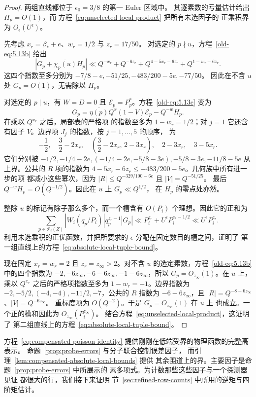 \documentclass[11pt,a4paper]{article}
\numberwithin{equation}{section}
\numberwithin{figure}{section}
\theoremstyle{definition}
\theoremstyle{remark}
\begin{document}
\begin{proof}
两组直线都位于 $\epsilon_0=3/8$ 的第一 Euler 区域中。
其逐素数的亏量估计给出 $H_p=O(1)$，而
方程~\eqref{eq:unselected-local-product} 把所有未选因子的
正乘积界为 $O_\epsilon(U^\epsilon)$。

先考虑 $x_r=\beta_*+e$、$w_r=1/2$ 与 $z_r=17/50$。
对选定的 $p\nmid u$，方程~\eqref{old-eq:5.13b} 给出
\[
 |G_p+\overline{\chi_p(u)}H_p|
 \ll Q^{-x_r}+Q^{-6z_r}
       +Q^{4-5x_r-6z_r}+Q^{1-w_r-6z_r}.
\]
这四个指数至多分别为
$-7/8-e,-51/25,-483/200-5e,-77/50$。
因此在不含 $u$ 处 $G_p=O(1)$，无需除以 $H_p$。

对选定的 $p\mid u$，有 $W=D=0$ 且
$\mathcal E_p=P_p^*$。方程~\eqref{old-eq:5.13c} 变为
\[
 G_p=\overline{\eta(p)}Q^x(1-V)\mathcal E_p-Q^{-w}H_p.
\]
在乘以 $Q^{x_r}$ 之后，局部表的严格项
的指数至多为 $1-w_r=1/2$；对 $j=1$ 它还含有因子
$V$。边界项 $J_j$ 的指数，按 $j=1,\ldots,5$ 的顺序，
为
\[
 -\frac12,\quad \frac32-2x_r,\quad
 \left(\frac32-2x_r,\,2-3x_r\right),\quad
 2-3x_r,\quad 3-5x_r.
\]
它们分别被
$-1/2,-1/4-2e,(-1/4-2e,-5/8-3e),-5/8-3e,-11/8-5e$
从上界。公共的 $R$ 项的指数为
$4-5x_r-6z_r\le-483/200-5e$。几何族中所有进一步的项
都减小这些幂次，因为
$|R|\le Q^{-329/100-6e}$ 且 $|V|=Q^{-51/25}$。
最后 $Q^{-w}H_p=O(Q^{-1/2})$。因此在 $u$ 上 $G_p\ll Q^{1/2}$，
在 $H_p$ 的零点处亦然。

整除 $u$ 的标记有除子那么多个，而一个槽含有 $O(P_i)$
个理想。因此它的正和为
\begin{equation}\label{eq:small-line-positive-slot}
 \sum_{p\in\mathcal P_i(Z)}
       |W_i(q_p/P_i)|q_p^{z_r-1}|G_p|
 \ll P_i^{z_r}+U^\epsilon P_i^{z_r-1/2}
 \ll U^\epsilon P_i^{z_r}.
\end{equation}
利用未选乘积的正优函数，并把所要求的 $\epsilon$
分配在固定数目的槽之间，证明了
第一组直线上的方程~\eqref{eq:absolute-local-tuple-bound}。

现在固定 $x_r=w_r=2$ 且 $z_r=z_\infty>2$。对不含
$u$ 的选定素数，方程~\eqref{old-eq:5.13b} 中的四个指数为
$-2,-6z_\infty,-6-6z_\infty,-1-6z_\infty$，所以
$G_p=O_{z_\infty}(1)$。在 $u$ 上，乘以
$Q^{x_r}$ 之后的严格项指数至多为 $1-w_r=-1$。边界指数为
$-2,-5/2,(-4,-4),-11/2,-7$，公共的 $R$ 指数为
$-6-6z_\infty$，且 $|R|=Q^{-8-6z_\infty}$、$|V|=Q^{-6z_\infty}$。
重标度项为 $O(Q^{-2})$。于是 $G_p=O_{z_\infty}(1)$ 在 $u$ 上
也成立。一个正的槽和因此为 $O_{z_\infty}(P_i^{z_\infty})$。
结合方程~\eqref{eq:unselected-local-product}，这证明了
第二组直线上的方程~\eqref{eq:absolute-local-tuple-bound}。
\end{proof}


方程~\eqref{eq:compensated-poisson-identity} 提供刚刚在低端受界的物理函数的完整高
表示。
命题~\ref{prop:probe-errors} 与分子联合控制误差因子，
而引理~\ref{lem:compensated-absolute-local-bounds} 提供
其余围道上的界。主要因子是命题~\ref{prop:probe-errors} 中所展示的
素多项式。为计数那些这些因子与一个探测器见证
都很大的行，我们接下来证明
节~\ref{sec:refined-row-counts} 中所用的逆矩与四阶矩估计。
\end{document}
